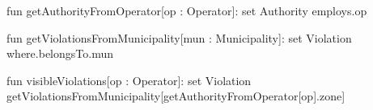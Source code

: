 \begin{alloy}
fun getAuthorityFromOperator[op : Operator]: set Authority {
    employs.op
}

fun getViolationsFromMunicipality[mun : Municipality]: set Violation{
    where.belongsTo.mun
}

fun visibleViolations[op : Operator]: set Violation{
    getViolationsFromMunicipality[getAuthorityFromOperator[op].zone]
}
\end{alloy}